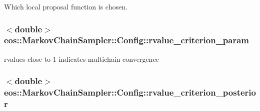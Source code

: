 Which local proposal function is chosen. \hypertarget{classeos_1_1MarkovChainSampler_1_1Config_ae8f8b1d037b655fe421c642cfe1d09a3}{
\subsubsection[{rvalue\_\-criterion\_\-param}]{$<$double$>$ {\bf eos::MarkovChainSampler::Config::rvalue\_\-criterion\_\-param}}}
\label{classeos_1_1MarkovChainSampler_1_1Config_ae8f8b1d037b655fe421c642cfe1d09a3}


rvalues close to 1 indicates multichain convergence \hypertarget{classeos_1_1MarkovChainSampler_1_1Config_ac63f8561002681b27414ef775f6f7c2c}{
\subsubsection[{rvalue\_\-criterion\_\-posterior}]{$<$double$>$ {\bf eos::MarkovChainSampler::Config::rvalue\_\-criterion\_\-posterior}}}
\label{classeos_1_1MarkovChainSampler_1_1Config_ac63f8561002681b27414ef775f6f7c2c}


